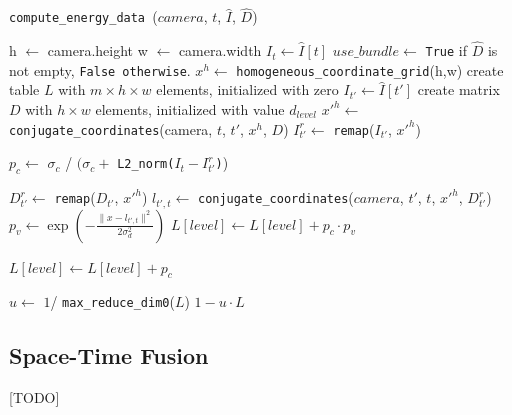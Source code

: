 \documentclass[notitlepage,english]{hgbreport}
\begin{document}
\begin{algorithm}[H]
	\caption{\texttt{compute\_energy\_data }($camera$, $t$, $\hat I$, $\hat D$)}
	\label{alg:energy_data}
	\begin{algorithmic}[1]
		\State h $\leftarrow$ camera.height
		\State w $\leftarrow$ camera.width
		\State $I_t \leftarrow \hat I[ t ]$
		\State $use\_bundle\leftarrow $ \texttt{True} if $\hat D$ is not empty, \texttt{False otherwise}.
		\State
		\State $x^h \leftarrow$ \texttt{homogeneous\_coordinate\_grid}(h,w)
		\State create table $L$ with $m\times h \times w$ elements, initialized with zero
		\State
		\State $I_{t'} \leftarrow \hat I[ t' ]$
		\State create matrix $D$ with $h \times w$ elements, initialized with value $d_{level}$
		\State $x'^h\leftarrow$ \texttt{conjugate\_coordinates}(camera, $t$,  $t'$, $x^h$, $D$)
		\State $I^r_{t'} \leftarrow$ \texttt{remap}($I_{t'}$, $x'^h$)

		\State $p_c \leftarrow$  $\sigma_c$ / $(\sigma_c +$ \texttt{L2\_norm($I_t - I^r_{t'}$)})
		\State

		
			\State $D^r_{t'} \leftarrow$ \texttt{remap}($D_{t'}$, $x'^h$)
			\State $l_{t',t}\leftarrow$ \texttt{conjugate\_coordinates}($camera$, $t'$,  $t$, $x'^h$, $D^r_{t'}$)
			\State $p_v \leftarrow \exp\left(-\frac{\lVert x - l_{t',t} \rVert^2} {2\sigma_d^2} \right)$
			\State $L[level] \leftarrow L[level] + p_c\cdot p_v$


		\Else
			\State $L[level] \leftarrow L[level] + p_c$
		\EndIf

		\EndFor
		\EndFor
		\State
		\State $u \leftarrow$ $1$/ \texttt{max\_reduce\_dim0}($L$)
		\State \Return $1 - u\cdot L$
	\end{algorithmic}
\end{algorithm}

\subsection{Space-Time Fusion}
[TODO]


\end{document}
